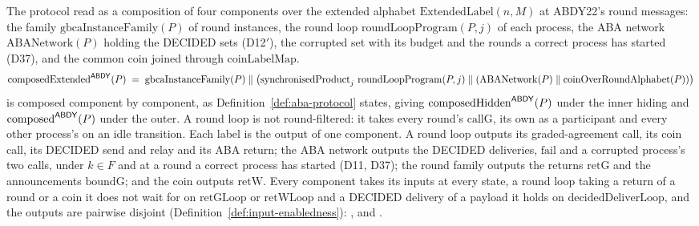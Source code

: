 \begin{definition}
  \label{def:aba-composed}
  \leanok
  The protocol read as a composition of four components over the extended alphabet $\mathrm{ExtendedLabel}(n, M)$ at ABDY22's round messages: the family $\mathrm{gbcaInstanceFamily}(P)$ of round instances, the round loop $\mathrm{roundLoopProgram}(P,j)$ of each process, the ABA network $\mathrm{ABANetwork}(P)$ holding the DECIDED sets (D12$'$), the corrupted set with its budget and the rounds a correct process has started (D37), and the common coin joined through $\mathrm{coinLabelMap}$.
  \[
    \mathrm{composedExtended}^{\mathsf{ABDY}}(P) \;=\;
      \mathrm{gbcaInstanceFamily}(P) \parallel \bigl(\mathrm{synchronisedProduct}_{j}\ \mathrm{roundLoopProgram}(P,j)
        \parallel (\mathrm{ABANetwork}(P) \parallel \mathrm{coinOverRoundAlphabet}(P))\bigr)
  \]
  is composed component by component, as Definition~\ref{def:aba-protocol} states, giving $\mathrm{composedHidden}^{\mathsf{ABDY}}(P)$ under the inner hiding and $\mathrm{composed}^{\mathsf{ABDY}}(P)$ under the outer.
  A round loop is not round-filtered: it takes every round's $\mathrm{callG}$, its own as a participant and every other process's on an idle transition.
  Each label is the output of one component.
  A round loop outputs its graded-agreement call, its coin call, its DECIDED send and relay and its ABA return; the ABA network outputs the DECIDED deliveries, $\mathrm{fail}$ and a corrupted process's two calls, under $k \in F$ and at a round a correct process has started (D11, D37); the round family outputs the returns $\mathrm{retG}$ and the announcements $\mathrm{boundG}$; and the coin outputs $\mathrm{retW}$.
  Every component takes its inputs at every state, a round loop taking a return of a round or a coin it does not wait for on $\mathrm{retGLoop}$ or $\mathrm{retWLoop}$ and a DECIDED delivery of a payload it holds on $\mathrm{decidedDeliverLoop}$, and the outputs are pairwise disjoint (Definition~\ref{def:input-enabledness}): ,  and .

\end{definition}
